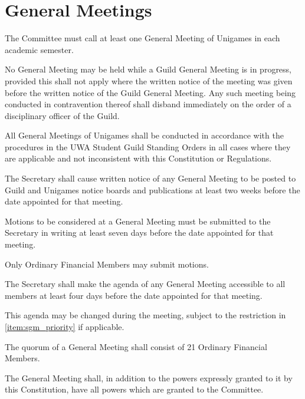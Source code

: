\documentclass[a4paper]{article}
\begin{document}
\section{General Meetings} \label{sec:general_meetings}
\begin{myEnumerate}
    \item The Committee must call at least one General Meeting of Unigames in each academic semester.
    \item No General Meeting may be held while a Guild General Meeting is in progress, provided this shall not apply where the written notice of the meeting was given before the written notice of the Guild General Meeting. Any such meeting being conducted in contravention thereof shall disband immediately on the order of a disciplinary officer of the Guild.
    \item All General Meetings of Unigames shall be conducted in accordance with the procedures in the UWA Student Guild Standing Orders in all cases where they are applicable and not inconsistent with this Constitution or Regulations.
    \item \label{item:gm_notice} The Secretary shall cause written notice of any General Meeting to be posted to Guild and Unigames notice boards and publications at least two weeks before the date appointed for that meeting.
    \item Motions to be considered at a General Meeting must be submitted to the Secretary in writing at least seven days before the date appointed for that meeting.
        \begin{myEnumerate}
            \item Only Ordinary Financial Members may submit motions.
        \end{myEnumerate}
    \item The Secretary shall make the agenda of any General Meeting accessible to all members at least four days before the date appointed for that meeting.
        \begin{myEnumerate}
            \item This agenda may be changed during the meeting, subject to the restriction in \cref{item:sgm_priority} if applicable.
        \end{myEnumerate}
    \item The quorum of a General Meeting shall consist of 21 Ordinary Financial Members.
    \item The General Meeting shall, in addition to the powers expressly granted to it by this Constitution, have all powers which are granted to the Committee.

\end{myEnumerate}
\end{document}
